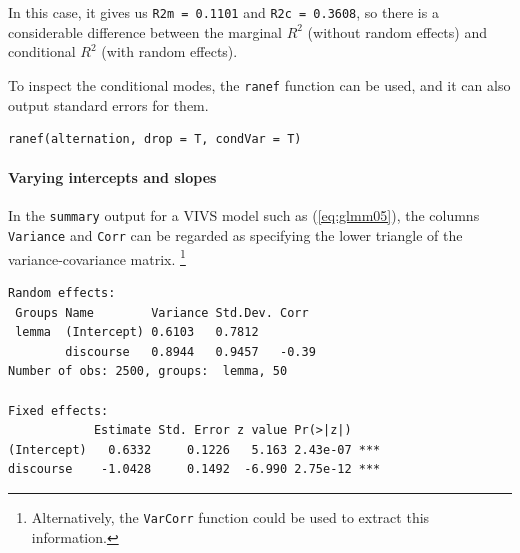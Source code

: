 \documentclass[a4paper,12pt]{article}
\begin{document}
\enlargethispage{\baselineskip}

In this case, it gives us \texttt{R2m = 0.1101} and \texttt{R2c = 0.3608}, so there is a considerable difference between the marginal $R^2$ (without random effects) and conditional $R^2$ (with random effects).

To inspect the conditional modes, the \texttt{ranef} function can be used, and it can also output standard errors for them.

\vspace{0.5\baselineskip}

\begin{lstlisting}
ranef(alternation, drop = T, condVar = T)
\end{lstlisting}

% 
% 
% 

\paragraph{Varying intercepts and slopes}

In the \texttt{summary} output for a VIVS model such as (\ref{eq:glmm05}), the columns \texttt{Variance} and \texttt{Corr} can be regarded as specifying the lower triangle of the variance-covariance matrix.%
\footnote{Alternatively, the \texttt{VarCorr} function could be used to extract this information.}

\vspace{0.5\baselineskip}

\begin{lstlisting}
Random effects:
 Groups Name        Variance Std.Dev. Corr 
 lemma  (Intercept) 0.6103   0.7812        
        discourse   0.8944   0.9457   -0.39
Number of obs: 2500, groups:  lemma, 50

Fixed effects:
            Estimate Std. Error z value Pr(>|z|)    
(Intercept)   0.6332     0.1226   5.163 2.43e-07 ***
discourse    -1.0428     0.1492  -6.990 2.75e-12 ***
\end{lstlisting}
\end{document}
